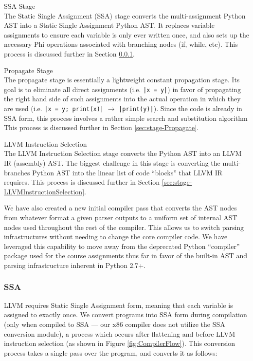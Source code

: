 \documentclass[11pt,twocolumn]{article}
\newenvironment{packed_desc}{
\begin{description}
  \setlength{\itemsep}{1pt}
  \setlength{\parskip}{0pt}
  \setlength{\parsep}{0pt}
}{\end{description}}
\begin{document}
\begin{packed_desc}
\item[SSA Stage] \hfill \\
  The Static Single Assignment (SSA) stage converts
  the multi-assignment Python AST into a Static Single Assignment
  Python AST. It replaces variable assignments to ensure each variable
  is only ever written once, and also sets up the necessary Phi operations
  associated with branching nodes (if, while, etc).
  This process is discussed further in Section \ref{sec:stage-SSA}.
\item[Propagate Stage] \hfill \\
  The propagate stage is essentially a
  lightweight constant propagation stage. Its goal is to eliminate
  all direct assignments (i.e. \texttt{|x = y|}) in favor of propagating
  the right hand side of such assignments into the actual operation in
  which they are used (i.e. \texttt{|x = y; print(x)|} $\rightarrow$
  \texttt{|print(y)|}). Since the code is already in SSA form, this
  process involves a rather simple search and substitution algorithm
  This process is discussed further in Section \ref{sec:stage-Propagate}.
\item[LLVM Instruction Selection] \hfill \\
  The LLVM Instruction Selection stage
  converts the Python AST into an LLVM IR (assembly) AST. The biggest
  challenge in this stage is converting the multi-branches Python AST
  into the linear list of code ``blocks'' that LLVM IR requires. This
  process is discussed further in Section
  \ref{sec:stage-LLVMInstructionSelection}.
\end{packed_desc}

We have also created a new initial compiler pass that converts the AST
nodes from whatever format a given parser outputs to a uniform set of
internal AST nodes used throughout the rest of the compiler. This
allows us to switch parsing infrastructures without needing to change
the core compiler code. We have leveraged this capability to move away
from the deprecated Python ``compiler'' package used for the course
assignments thus far in favor of the built-in AST and parsing
infrastructure inherent in Python 2.7+.

\subsubsection{SSA}
\label{sec:stage-SSA}

LLVM requires Static Single Assignment form, meaning that each
variable is assigned to exactly once.  We convert programs into SSA
form during compilation (only when compiled to SSA --- our x86
compiler does not utilize the SSA conversion module), a process which
occurs after flattening and before LLVM instruction
selection (as shown in Figure \ref{fig:CompilerFlow}).  This
conversion process takes a single pass over the program, and converts
it as follows:
\end{document}
